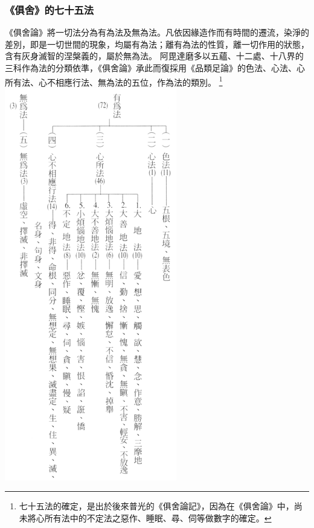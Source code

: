 \subsubsection{《俱舍》的七十五法}
《俱舍論》將一切法分為有為法及無為法。凡依因緣造作而有時間的遷流，染淨的差別，即是一切世間的現象，均屬有為法；離有為法的性質，離一切作用的狀態，含有灰身滅智的涅槃義的，屬於無為法。
阿毘達磨多以五蘊、十二處、十八界的三科作為法的分類依準，《俱舍論》承此而復採用《品類足論》的色法、心法、心所有法、心不相應行法、無為法的五位，作為法的類別。
\footnote{七十五法的確定，是出於後來普光的《俱舍論記》，因為在《俱舍論》中，尚未將心所有法中的不定法之惡作、睡眠、尋、伺等做數字的確定。}
\includegraphics[scale=0.5]{释家/images/俱舍75法.png}

